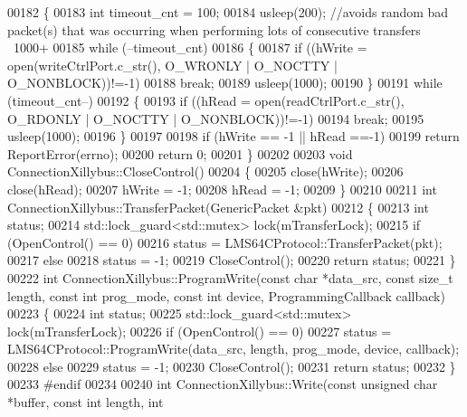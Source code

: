 \begin{DoxyCode}
00182 \{
00183     \textcolor{keywordtype}{int} timeout\_cnt = 100;
00184     usleep(200);  \textcolor{comment}{//avoids random bad packet(s) that was occurring when performing lots of consecutive
       transfers ~1000+}
00185     \textcolor{keywordflow}{while} (--timeout\_cnt)
00186     \{
00187        \textcolor{keywordflow}{if} ((hWrite = open(writeCtrlPort.c\_str(), O\_WRONLY | O\_NOCTTY | O\_NONBLOCK))!=-1)
00188            \textcolor{keywordflow}{break};
00189        usleep(1000);
00190     \}
00191     \textcolor{keywordflow}{while} (timeout\_cnt--)
00192     \{
00193        \textcolor{keywordflow}{if} ((hRead = open(readCtrlPort.c\_str(), O\_RDONLY | O\_NOCTTY | O\_NONBLOCK))!=-1)
00194            \textcolor{keywordflow}{break};
00195        usleep(1000);
00196     \}
00197 
00198     \textcolor{keywordflow}{if} (hWrite == -1 || hRead ==-1)
00199         \textcolor{keywordflow}{return} ReportError(errno);
00200     \textcolor{keywordflow}{return} 0;
00201 \}
00202 
00203 \textcolor{keywordtype}{void} ConnectionXillybus::CloseControl()
00204 \{
00205     close(hWrite);
00206     close(hRead);
00207     hWrite = -1;
00208     hRead = -1;
00209 \}
00210 
00211 \textcolor{keywordtype}{int} ConnectionXillybus::TransferPacket(GenericPacket &pkt)
00212 \{
00213     \textcolor{keywordtype}{int} status;
00214     std::lock\_guard<std::mutex> lock(mTransferLock);
00215     \textcolor{keywordflow}{if} (OpenControl() == 0)
00216         status = LMS64CProtocol::TransferPacket(pkt);
00217     \textcolor{keywordflow}{else}
00218         status = -1;
00219     CloseControl();
00220     \textcolor{keywordflow}{return} status;
00221 \}
00222 \textcolor{keywordtype}{int} ConnectionXillybus::ProgramWrite(\textcolor{keyword}{const} \textcolor{keywordtype}{char} *data\_src, \textcolor{keyword}{const} \textcolor{keywordtype}{size\_t} length, \textcolor{keyword}{const} \textcolor{keywordtype}{int} prog\_mode, \textcolor{keyword}{const} \textcolor{keywordtype}{
      int} device, ProgrammingCallback callback)
00223 \{
00224     \textcolor{keywordtype}{int} status;
00225     std::lock\_guard<std::mutex> lock(mTransferLock);
00226     \textcolor{keywordflow}{if} (OpenControl() == 0)
00227         status = LMS64CProtocol::ProgramWrite(data\_src, length, prog\_mode, 
      device, callback);
00228     \textcolor{keywordflow}{else}
00229         status = -1;
00230     CloseControl();
00231     \textcolor{keywordflow}{return} status;
00232 \}
00233 \textcolor{preprocessor}{#endif}
00234 
00240 \textcolor{keywordtype}{int} ConnectionXillybus::Write(\textcolor{keyword}{const} \textcolor{keywordtype}{unsigned} \textcolor{keywordtype}{char} *buffer, \textcolor{keyword}{const} \textcolor{keywordtype}{int} length, \textcolor{keywordtype}{int} 

\end{DoxyCode}

